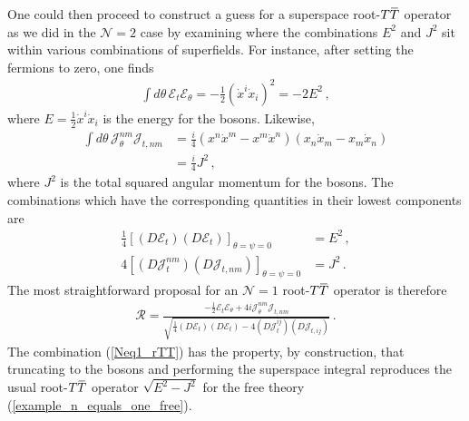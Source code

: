 \documentclass[12pt]{article}
\numberwithin{equation}{section}
\newcommand{\overbar}[1]{\mkern 1.5mu\overline{\mkern-1.5mu#1\mkern-1.5mu}\mkern 1.5mu}
\def\TT{{T\overbar{T}}}
\begin{document}
One could then proceed to construct a guess for a superspace root-$\TT$ operator as we did in the $\mathcal{N} = 2$ case by examining where the combinations $E^2$ and $J^2$ sit within various combinations of superfields. For instance, after setting the fermions to zero, one finds
%
\begin{align}
    \int d \theta \, \mathcal{E}_t \mathcal{E}_\theta = - \frac{1}{2} \left( \dot{x}^i \dot{x}_i \right)^2 = - 2 E^2 \, , 
\end{align}
%
where $E = \frac{1}{2} \dot{x}^i \dot{x}_i$ is the energy for the bosons. Likewise,
%
\begin{align}
    \int d \theta \, \mathcal{J}_\theta^{nm} \mathcal{J}_{t, nm} &= \frac{i}{4} \left( x^n \dot{x}^m - x^m \dot{x}^n \right) \left( x_n \dot{x}_m - x_m \dot{x}_n \right) \nonumber \\
    &= \frac{i}{4} J^2 \, ,
\end{align}
%
where $J^2$ is the total squared angular momentum for the bosons. The combinations which have the corresponding quantities in their lowest components are
%
\begin{align}
    \frac{1}{4}  \left[ ( D \mathcal{E}_t ) ( D \mathcal{E}_t ) \right]_{\theta = \psi = 0} &= E^2 \, , \nonumber \\
    4 \left[ ( D \mathcal{J}_t^{nm} ) ( D \mathcal{J}_{t, nm} ) \right]_{\theta = \psi = 0} &= J^2 \, .
\end{align}
%
The most straightforward proposal for an $\mathcal{N} = 1$ root-$\TT$ operator is therefore
%
\begin{align}\label{Neq1_rTT}
    \mathcal{R} = \frac{ - \frac{1}{2} \mathcal{E}_t \mathcal{E}_\theta + 4 i \mathcal{J}_\theta^{nm} \mathcal{J}_{t, nm} }{\sqrt{ \frac{1}{4}  ( D \mathcal{E}_t ) ( D \mathcal{E}_t ) - 4 ( D \mathcal{J}_t^{ij} ) ( D \mathcal{J}_{t, ij} )  } } \, .
\end{align}
%
The combination (\ref{Neq1_rTT}) has the property, by construction, that truncating to the bosons and performing the superspace integral reproduces the usual root-$\TT$ operator $\sqrt{E^2 - J^2}$ for the free theory (\ref{example_n_equals_one_free}).
\end{document}
